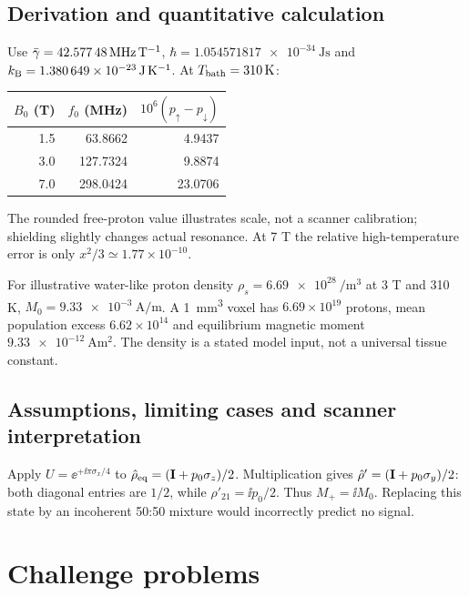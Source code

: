 \subsection{Derivation and quantitative calculation}
\begin{workedexample}
Use $\bar{\gamma}=\SI{42.57748}{\mega\hertz\per\tesla}$,
$\hbar=\SI{1.054571817e-34}{\joule\second}$ and
$k_{\rm B}=\SI{1.380649e-23}{\joule\per\kelvin}$.
At $T_{\rm bath}=\SI{310}{\kelvin}$:
\begin{center}
\begin{tabular}{@{}rrr@{}}\toprule
$B_0$ (T)&$f_0$ (MHz)&$10^6(p_\uparrow-p_\downarrow)$\\\midrule
1.5&63.8662&4.9437\\3.0&127.7324&9.8874\\7.0&298.0424&23.0706\\\bottomrule
\end{tabular}
\end{center}
The rounded free-proton value illustrates scale, not a scanner calibration;
shielding slightly changes actual resonance.
At 7 T the relative high-temperature error is only
$x^2/3\simeq1.77\times10^{-10}$.
\end{workedexample}
\begin{workedexample}
For illustrative water-like proton density
$\rho_s=\SI{6.69e28}{\per\cubic\metre}$ at 3 T and 310 K,
$M_0=\SI{9.33e-3}{\ampere\per\metre}$.
A \SI{1}{\cubic\milli\metre} voxel has $6.69\times10^{19}$ protons,
mean population excess $6.62\times10^{14}$ and equilibrium magnetic
moment $\SI{9.33e-12}{\ampere\square\metre}$.
The density is a stated model input, not a universal tissue constant.
\end{workedexample}
\subsection{Assumptions, limiting cases and scanner interpretation}
\begin{workedexample}
Apply $U=\ee^{+\ii\pi\sigma_x/4}$ to
$\hat{\rho}_{\rm eq}=(\mathbf{I}+p_0\sigma_z)/2$.
Multiplication gives $\hat{\rho}'=(\mathbf{I}+p_0\sigma_y)/2$:
both diagonal entries are $1/2$, while $\rho'_{21}=\ii p_0/2$.
Thus $M_+=\ii M_0$. Replacing this state by an incoherent 50:50
mixture would incorrectly predict no signal.
\end{workedexample}

\section{Challenge problems}
\label{sec:02:challenge-problems}
